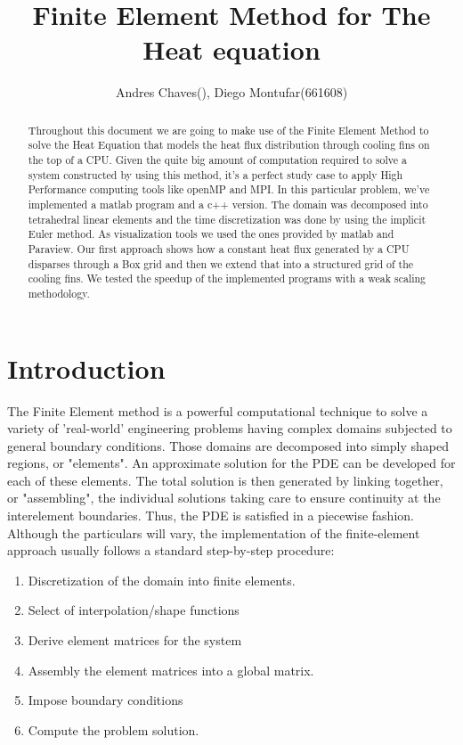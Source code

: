 \documentclass[12pt]{article}
\begin{document}
	\title{Finite Element Method for The Heat equation}
	\author{Andres Chaves(), Diego Montufar(661608)}
	
	\maketitle
	
	\begin{abstract}
		Throughout this document we are going to make use of the Finite Element Method to solve the Heat Equation that models the heat flux distribution through cooling fins on the top of a CPU.  Given the quite big amount of computation required to solve a system constructed by using this method, it's a perfect study case to apply High Performance computing tools like openMP and MPI. In this particular problem, we've implemented a matlab program and a c++ version. The domain was decomposed into tetrahedral linear elements and the time discretization was done by using the implicit Euler method. As visualization tools we used the ones provided by matlab and Paraview. Our first approach shows how a constant heat flux generated by a CPU disparses through a Box grid and then we extend that into a structured grid of the cooling fins. We tested the speedup of the implemented programs with a weak scaling methodology.
	\end{abstract}
	
	\section{Introduction}
	The Finite Element method is a powerful computational technique to solve a variety of 'real-world' engineering problems having complex domains subjected to general boundary conditions. Those domains are decomposed into simply shaped regions, or "elements". An approximate solution for the PDE can be developed for each of these elements. The total solution is then generated by linking together, or "assembling", the individual solutions taking care to ensure continuity at the interelement boundaries. Thus, the PDE is satisfied in a piecewise fashion.\\
	
Although the particulars will vary, the implementation of the finite-element approach usually follows a standard step-by-step procedure:\\

\begin{enumerate}
  \item Discretization of the domain into finite elements.
  \item Select of interpolation/shape functions
  \item Derive element matrices for the system
  \item Assembly the element matrices into a global matrix.
  \item Impose boundary conditions
  \item Compute the problem solution.
\end{enumerate}
\end{document}
